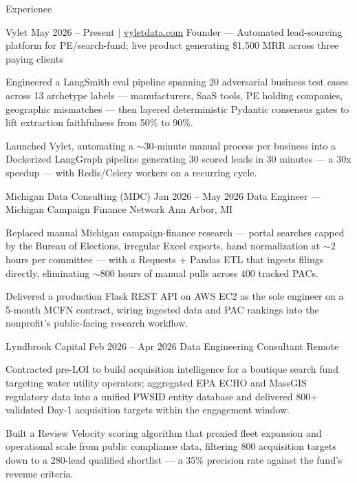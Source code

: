 \documentclass[
	11pt
]{../../../template}
\begin{document}
	\begin{rSection}{E}{xperience}
		\begin{rSectionEntry}
			{Vylet}
			{May 2026 -- Present $\vert$ \href{https://vyletdata.com}{vyletdata.com}}
			{Founder --- Automated lead-sourcing platform for PE/search-fund; live product generating \$1,500 MRR across three paying clients}
			{}
			{}

			\item Engineered a LangSmith eval pipeline spanning 20 adversarial business test cases across 13 archetype labels --- manufacturers, SaaS tools, PE holding companies, geographic mismatches --- then layered deterministic Pydantic consensus gates to lift extraction faithfulness from 50\% to 90\%.
			\item Launched Vylet, automating a $\sim$30-minute manual process per business into a Dockerized LangGraph pipeline generating 30 scored leads in 30 minutes --- a 30x speedup --- with Redis/Celery workers on a recurring cycle.
		\end{rSectionEntry}

		\begin{rSectionEntry}
			{Michigan Data Consulting (MDC)}
			{Jan 2026 -- May 2026}
			{Data Engineer --- Michigan Campaign Finance Network}
			{}
			{Ann Arbor, MI}

			\item Replaced manual Michigan campaign-finance research --- portal searches capped by the Bureau of Elections, irregular Excel exports, hand normalization at $\sim$2 hours per committee --- with a Requests + Pandas ETL that ingests filings directly, eliminating $\sim$800 hours of manual pulls across 400 tracked PACs.
			\item Delivered a production Flask REST API on AWS EC2 as the sole engineer on a 5-month MCFN contract, wiring ingested data and PAC rankings into the nonprofit's public-facing research workflow.
		\end{rSectionEntry}

		\begin{rSectionEntry}
			{Lyndbrook Capital}
			{Feb 2026 -- Apr 2026}
			{Data Engineering Consultant}
			{}
			{Remote}

			\item Contracted pre-LOI to build acquisition intelligence for a boutique search fund targeting water utility operators; aggregated EPA ECHO and MassGIS regulatory data into a unified PWSID entity database and delivered 800+ validated Day-1 acquisition targets within the engagement window.
			\item Built a Review Velocity scoring algorithm that proxied fleet expansion and operational scale from public compliance data, filtering 800 acquisition targets down to a 280-lead qualified shortlist --- a 35\% precision rate against the fund's revenue criteria.
		\end{rSectionEntry}


\end{rSection}
\end{document}

